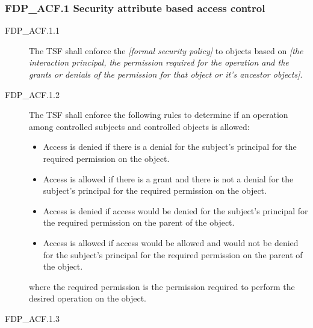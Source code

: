 \documentclass[10pt,a4paper,english]{article}
\begin{document}

\hypertarget{fdp-acf-1-security-attribute-based-access-control}{}
\subsubsection*{FDP{\_}ACF.1 Security attribute based access control}
\begin{description}
\item[FDP{\_}ACF.1.1]

The TSF shall enforce the \emph{{[}formal security policy]} to objects
based on \emph{{[}the interaction principal, the permission required for
the operation and the grants or denials of the permission for that
object or it's ancestor objects]}.

\item[FDP{\_}ACF.1.2]

The TSF shall enforce the following rules to determine
if an operation among controlled subjects and controlled objects is
allowed:
\begin{itemize}
\item {} 
Access is denied if there is a denial for the subject's
principal for the required permission on the object.

\item {} 
Access is allowed if there is a grant and there is not a denial
for the subject's principal for the required permission on the object.

\item {} 
Access is denied if access would be denied for the subject's
principal for the required permission on the parent of the
object.

\item {} 
Access is allowed if access would be allowed and would not be
denied for the subject's principal for the required permission
on the parent of the object.

\end{itemize}

where the required permission is the permission required to
perform the desired operation on the object.

\item[FDP{\_}ACF.1.3]


\end{description}
\end{document}
